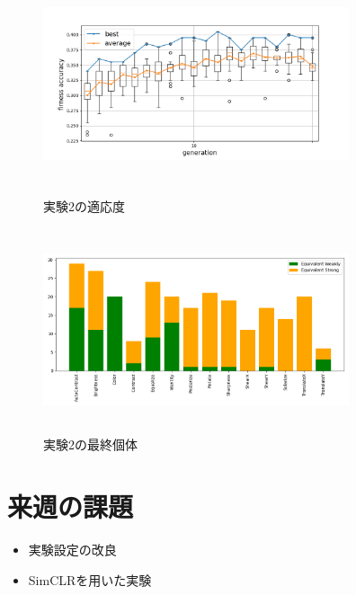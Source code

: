 \documentclass[twocolumn]{jarticle}     %
\begin{document}
\begin{figure}[h]
	\begin{center}
		\vspace*{-3mm}
		\hspace*{-12mm}
		\includegraphics[height=65mm,width=90mm]{graph2_1.png}
		\caption{実験2の適応度\label{fig:ex2_1}}
	\end{center}
\end{figure}

\begin{figure}[h]
	\begin{center}
		\vspace*{-3mm}
		\hspace*{-12mm}
		\includegraphics[height=60mm,width=90mm]{graph2_2.png}
		\caption{実験2の最終個体\label{fig:ex2_2}}
	\end{center}
\end{figure}



\section{来週の課題}
\begin{itemize}
	\item 実験設定の改良
	\item SimCLRを用いた実験
\end{itemize}
\end{document}
